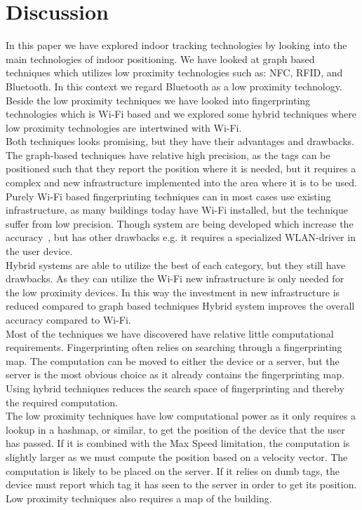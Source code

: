 \section{Discussion}
In this paper we have explored indoor tracking technologies by looking into the main technologies of indoor positioning. 
We have looked at graph based techniques which utilizes low proximity technologies such as: NFC, RFID, and Bluetooth. 
In this context we regard Bluetooth as a low proximity technology. 
Beside the low proximity techniques we have looked into fingerprinting technologies which is Wi-Fi based and we explored some hybrid techniques where low proximity technologies are intertwined with Wi-Fi. \\

Both techniques looks promising, but they have their advantages and drawbacks. 
The graph-based techniques have relative high precision, as the tags can be positioned such that they report the position where it is needed, but it requires a complex and new infrastructure implemented into the area where it is to be used. \\

Purely Wi-Fi based fingerprinting techniques can in most cases use existing infrastructure, as many buildings today  have Wi-Fi installed, but the technique suffer from low precision.
Though system are being developed which increase the accuracy~\cite{Youssef2005}, but has other drawbacks e.g. it requires a specialized WLAN-driver in the user device. \\

Hybrid systems are able to utilize the best of each category, but they still have drawbacks. 
As they can utilize the Wi-Fi new infrastructure is only needed for the low proximity devices.
In this way the investment in new infrastructure is reduced compared to graph based techniques
Hybrid system improves the overall accuracy compared to Wi-Fi. \\

Most of the techniques we have discovered have relative little computational requirements. 
Fingerprinting often relies on searching through a fingerprinting map. 
The computation can be moved to either the device or a server, but the server is the most obvious choice as it already contains the fingerprinting map. 
Using hybrid techniques reduces the search space of fingerprinting and thereby the required computation. \\

The low proximity techniques have low computational power as it only requires a lookup in a hashmap, or similar, to get the position of the device that the user has passed. 
If it is combined with the Max Speed limitation, the computation is slightly larger as we must compute the position based on a velocity vector. 
The computation is likely to be placed on the server. 
If it relies on dumb tags, the device must report which tag it has seen to the server in order to get its position. 
Low proximity techniques also requires a map of the building.\\

